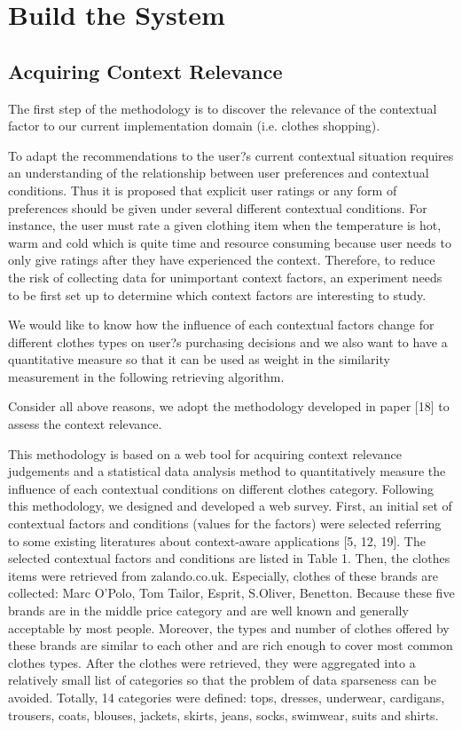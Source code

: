 \chapter{Build the System}\label{chapter:build}

\section{Acquiring Context Relevance} \label{sec:acr}

The first step of the methodology is to discover the relevance of the contextual factor to our current implementation domain (i.e. clothes shopping). 

To adapt the recommendations to the user?s current contextual situation requires an understanding of the relationship between user preferences and contextual conditions. Thus it is proposed that explicit user ratings or any form of preferences should be given under several different contextual conditions. For instance, the user must rate a given clothing item when the temperature is hot, warm and cold which is quite time and resource consuming because user needs to only give ratings after they have experienced the context. Therefore, to reduce the risk of collecting data for unimportant context factors, an experiment needs to be first set up to determine which context factors are interesting to study. 

We would like to know how the influence of each contextual factors change for different clothes types on user?s purchasing decisions and we also want to have a quantitative measure so that it can be used as weight in the similarity measurement in the following retrieving algorithm. 

Consider all above reasons, we adopt the methodology developed in paper [18] to assess the context relevance.

This methodology is based on a web tool for acquiring context relevance judgements and a statistical data analysis method to quantitatively measure the influence of each contextual conditions on different clothes category. Following this methodology, we designed and developed a web survey. First, an initial set of contextual factors and conditions (values for the factors) were selected referring to some existing literatures about context-aware applications [5, 12, 19]. The selected contextual factors and conditions are listed in Table 1. Then, the clothes items were retrieved from zalando.co.uk. Especially, clothes of these brands are collected: Marc O'Polo, Tom Tailor, Esprit, S.Oliver, Benetton. Because these five brands are in the middle price category and are well known and generally acceptable by most people. Moreover, the types and number of clothes offered by these brands are similar to each other and are rich enough to cover most common clothes types. After the clothes were retrieved, they were aggregated into a relatively small list of categories so that the problem of data sparseness can be avoided. Totally, 14 categories were defined: tops, dresses, underwear, cardigans, trousers, coats, blouses, jackets, skirts, jeans, socks, swimwear, suits and shirts.

